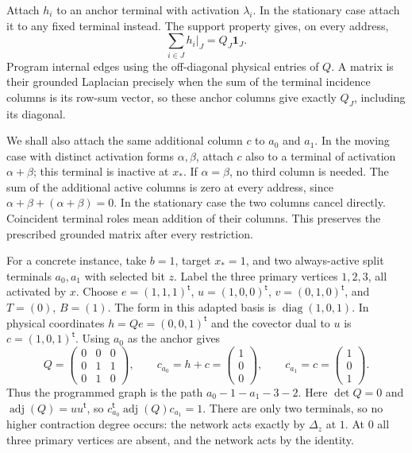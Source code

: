 Attach $h_i$ to an anchor terminal with activation $\lambda_i$.  In the
stationary case attach it to any fixed terminal instead.  The support
property gives, on every address,
\[
 \sum_{i\in J}h_i|_J=Q_J\mathbf1_J.
\]
Program internal edges using the off-diagonal
physical entries of $Q$.  A matrix is their grounded Laplacian precisely
when the sum of the terminal incidence columns is its row-sum vector,
so these anchor columns give exactly $Q_J$, including its diagonal.

We shall also attach the same additional column $c$ to $a_0$ and $a_1$.
In the moving case with distinct activation forms $\alpha,\beta$, attach
$c$ also to a terminal of activation $\alpha+\beta$; this terminal is
inactive at $x_*$.  If $\alpha=\beta$, no third column is needed.  The
sum of the additional active columns is zero at every address, since
$\alpha+\beta+(\alpha+\beta)=0$.  In the stationary case the two columns
cancel directly.  Coincident terminal roles mean addition of their
columns.  This preserves the prescribed grounded matrix after every
restriction.

For a concrete instance, take $b=1$, target $x_*=1$, and two always-active
split terminals $a_0,a_1$ with selected bit $z$.  Label the three primary
vertices $1,2,3$, all activated by $x$.  Choose
$e=(1,1,1)^{\mathsf t}$, $u=(1,0,0)^{\mathsf t}$,
$v=(0,1,0)^{\mathsf t}$, and $T=(0)$, $B=(1)$.
The form in this adapted basis is $\operatorname{diag}(1,0,1)$.
In physical coordinates $h=Qe=(0,0,1)^{\mathsf t}$ and the covector
dual to $u$ is $c=(1,0,1)^{\mathsf t}$.  Using $a_0$ as the anchor gives
\[
 Q=\begin{pmatrix}0&0&0\\0&1&1\\0&1&0\end{pmatrix},\qquad
 c_{a_0}=h+c=\begin{pmatrix}1\\0\\0\end{pmatrix},\qquad
 c_{a_1}=c=\begin{pmatrix}1\\0\\1\end{pmatrix}.
\]
Thus the programmed graph is the path
$a_0\! -\! 1\! -\! a_1\! -\! 3\! -\! 2$.
Here $\det Q=0$ and $\operatorname{adj}(Q)=uu^{\mathsf t}$, so
$c_{a_0}^{\mathsf t}\operatorname{adj}(Q)c_{a_1}=1$.
There are only two terminals, so no higher contraction degree occurs:
the network acts exactly by $\Delta_z$ at $1$.  At $0$ all three primary
vertices are absent, and the network acts by the identity.


